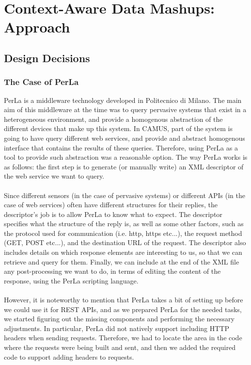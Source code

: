 \chapter{Context-Aware Data Mashups: Approach}
\label{capitolo4}
\thispagestyle{empty}

\section{Design Decisions}
\subsection{The Case of PerLa}
PerLa\cite{perla} is a middleware technology developed in Politecnico di Milano. The main aim of this middleware at the time was to query pervasive systems that exist in a heterogeneous environment, and provide a homogenous abstraction of the different devices that make up this system. In CAMUS, part of the system is going to have query different web services, and provide and abstract homogenous interface that contains the results of these queries. Therefore, using PerLa as a tool to provide such abstraction was a reasonable option. The way PerLa works is as follows: the first step is to generate (or manually write) an XML descriptor of the web service we want to query.\\\\
Since different sensors (in the case of pervasive systems) or different APIs (in the case of web services) often have different structures for their replies, the descriptor's job is to allow PerLa to know what to expect. The descriptor specifies what the structure of the reply is, as well as some other factors, such as the protocol used for communication (i.e. http, https etc...), the request method (GET, POST etc...), and the destination URL of the request. The descriptor also includes details on which response elements are interesting to us, so that we can retrieve and query for them. Finally, we can include at the end of the XML file any post-processing we want to do, in terms of editing the content of the response, using the PerLa scripting language.\\\\
However, it is noteworthy to mention that PerLa takes a bit of setting up before we could use it for REST APIs, and as we prepared PerLa for the needed tasks, we started figuring out the missing components and performing the necessary adjustments. In particular, PerLa did not natively support including HTTP headers when sending requests. Therefore, we had to locate the area in the code where the requests were being built and sent, and then we added the required code to support adding headers to requests.

